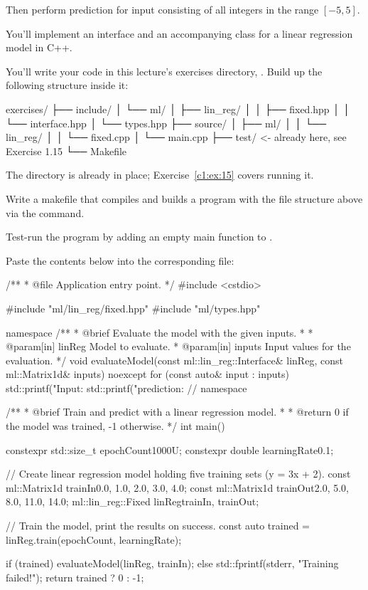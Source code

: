 Then perform prediction for input consisting of all integers in the range $[-5, 5]$.

\label{c1:set:2}
You'll implement an interface and an accompanying class for a linear regression model in C++.

\label{c1:ex:2}
You'll write your code in this lecture's exercises directory, . Build
up the following structure inside it:

\begin{console}
exercises/
├── include/
│   └── ml/
│       ├── lin_reg/
│       │   ├── fixed.hpp
│       │   └── interface.hpp
│       └── types.hpp
├── source/
│   ├── ml/
│   │   └── lin_reg/
│   │       └── fixed.cpp
│   └── main.cpp
├── test/                <- already here, see Exercise 1.15
└── Makefile
\end{console}

\noindent The  directory is already in place; Exercise~\ref{c1:ex:15} covers running it.

\label{c1:ex:3}
Write a makefile that compiles and builds a program with the file structure above via the
 command.

Test-run the program by adding an empty main function to .

\label{c1:ex:4}
Paste the contents below into the corresponding file:

\begin{cppcode}
/**
 * @file Application entry point.
 */
#include <cstdio>

#include "ml/lin_reg/fixed.hpp"
#include "ml/types.hpp"

namespace
{
/**
 * @brief Evaluate the model with the given inputs.
 *
 * @param[in] linReg Model to evaluate.
 * @param[in] inputs Input values for the evaluation.
 */
void evaluateModel(const ml::lin_reg::Interface& linReg, const ml::Matrix1d& inputs) noexcept
{
    for (const auto& input : inputs)
    {
        std::printf("Input: %
        std::printf("prediction: %
    }
}
} // namespace

/**
 * @brief Train and predict with a linear regression model.
 *
 * @return 0 if the model was trained, -1 otherwise.
 */
int main()
{
    constexpr std::size_t epochCount{1000U};
    constexpr double learningRate{0.1};

    // Create linear regression model holding five training sets (y = 3x + 2).
    const ml::Matrix1d trainIn{0.0, 1.0, 2.0, 3.0, 4.0};
    const ml::Matrix1d trainOut{2.0, 5.0, 8.0, 11.0, 14.0};
    ml::lin_reg::Fixed linReg{trainIn, trainOut};

    // Train the model, print the results on success.
    const auto trained = linReg.train(epochCount, learningRate);

    if (trained) { evaluateModel(linReg, trainIn); }
    else { std::fprintf(stderr, "Training failed!\n"); }
    return trained ? 0 : -1;
}
\end{cppcode}

